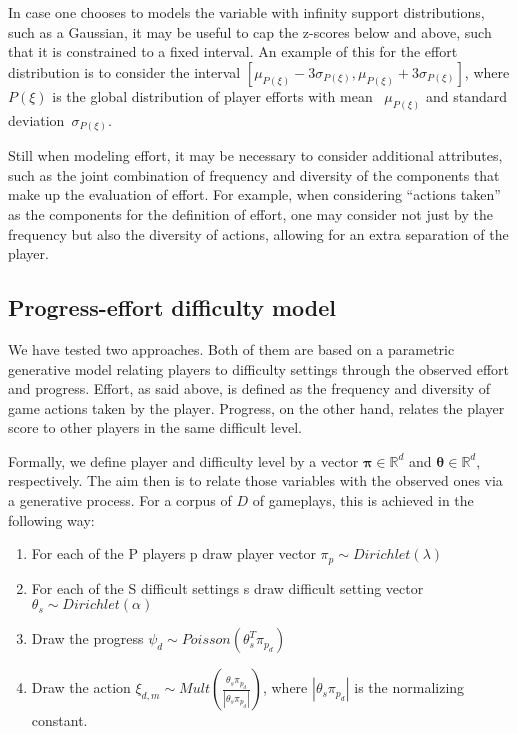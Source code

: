 In case one chooses to models the variable with infinity support distributions, such as a Gaussian, it may be useful to cap the z-scores below and above, such that it is constrained to a fixed interval. An example of this for the effort distribution is to consider the interval $[\mu_{P(\xi)}-3\sigma_{P(\xi)},\mu_{P(\xi)}+3\sigma_{P(\xi)}]$, where $P(\xi)$ is the global distribution of player efforts with mean ~$\mu_{P(\xi)}$ and standard deviation~$\sigma_{P(\xi)}$.

Still when modeling effort, it may be necessary to consider additional attributes, such as the joint combination of frequency and diversity of the components that make up the evaluation of effort. For example, when considering ``actions taken'' as the components for the definition of effort, one may consider not just by the frequency but also the diversity of actions, allowing for an extra separation of the player.

\subsection{Progress-effort difficulty model}

We have tested two approaches. Both of them are based on a parametric generative model relating players to difficulty settings through the observed effort and progress. Effort, as said above, is defined as the frequency and diversity of game actions taken by the player. Progress, on the other hand, relates the player score to other players in the same difficult level.

Formally, we define player and difficulty level by a vector $\boldsymbol{\pi}\in \mathbb{R}^d$ and $\boldsymbol{\theta}\in\mathbb{R}^d$, respectively. The aim then is to relate those variables with the observed ones via a generative process. For a corpus of $D$ of gameplays, this is achieved in the following way:\\
\begin{enumerate}
\item For each of the P players p draw player vector $\pi_{p} \sim Dirichlet(\lambda)$
\item For each of the S difficult settings s draw difficult setting vector $\theta_{s} \sim Dirichlet(\alpha)$
\item Draw the progress $\psi_d \sim Poisson( \theta_{s}^{T}\pi_{p_d})$
\item Draw the action $\xi_{d,m} \sim Mult(\frac{\theta_{s}\pi_{p_d}}{|\theta_{s}\pi_{p_d}|})$, where $|\theta_{s}\pi_{p_d}|$ is the normalizing constant.\\
\end{enumerate}

